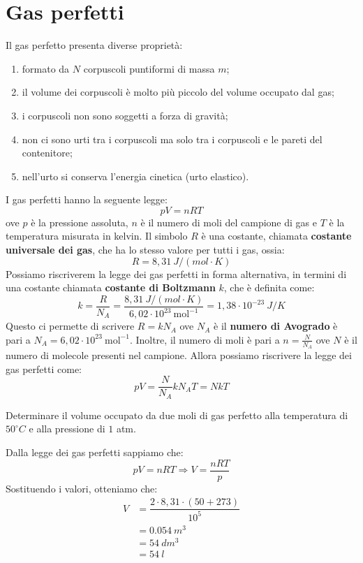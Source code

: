 \documentclass[12pt]{report}
\begin{document}
	\section{Gas perfetti}
	Il gas perfetto presenta diverse proprietà:
	\begin{enumerate}
		\item formato da $N$ corpuscoli puntiformi di massa $m$;
		\item il volume dei corpuscoli è molto più piccolo del volume occupato dal gas;
		\item i corpuscoli non sono soggetti a forza di gravità;
		\item non ci sono urti tra i corpuscoli ma solo tra i corpuscoli e le pareti del contenitore;
		\item nell'urto si conserva l'energia cinetica (urto elastico).
	\end{enumerate}
	I gas perfetti hanno la seguente legge:
	\[
	pV = nRT
	\]
	ove $p$ è la pressione assoluta, $n$ è il numero di moli del campione di gas e $T$ è la temperatura misurata in kelvin. Il simbolo $R$ è una costante, chiamata \textbf{costante universale dei gas}, che ha lo stesso valore per tutti i gas, ossia:
	\[
	R = 8,31\ J/(mol \cdot K)
	\]
	Possiamo riscriverem la legge dei gas perfetti in forma alternativa, in termini di una costante chiamata \textbf{costante di Boltzmann } $k$, che è definita come:
	\[
	k = \frac{R}{N_A} = \frac{8,31\ J/(mol \cdot K)}{6,02 \cdot 10^23\ \text{mol}^{-1}} = 1,38 \cdot 10^{-23}\ J/K
	\]
	Questo ci permette di scrivere $R = kN_A$ ove $N_A$ è il \textbf{numero di Avogrado} è pari a $N_A = 6,02 \cdot 10^{23}\ \text{mol}^{-1}$. Inoltre, il numero di moli è pari a $n = \frac{N}{N_A}$ ove $N$ è il numero di molecole presenti nel campione. Allora possiamo riscrivere la legge dei gas perfetti come:
	\[
	pV = \frac{N}{N_A}kN_AT = NkT
	\]
	\begin{example}{}{}
		\begin{assignment}{}{}
			Determinare il volume occupato da due moli di gas perfetto alla temperatura di $50^\circ C$ e alla pressione di $1$ atm.
		\end{assignment}
		Dalla legge dei gas perfetti sappiamo che:
		\[
		pV = nRT \Rightarrow V = \frac{nRT}{p}
		\]
		Sostituendo i valori, otteniamo che:
		\begin{align*}
			V &= \dfrac{2 \cdot 8,31 \cdot (50 + 273)}{10^5} \\
			&= 0.054\ m^3 \\
			&= 54\ dm^3 \\
			&= 54\ l
		\end{align*}
	\end{example}
\end{document}
